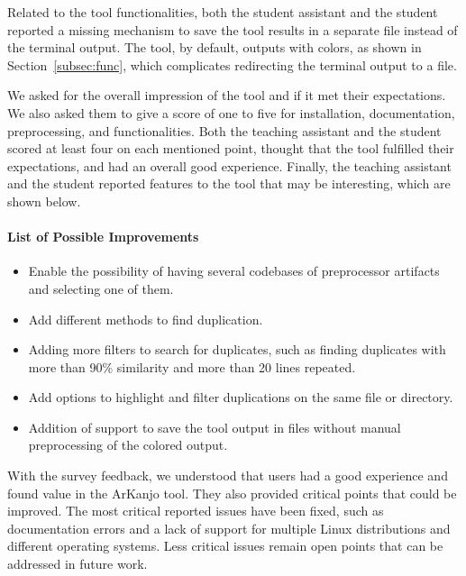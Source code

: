 Related to the tool functionalities, both the student assistant and the student reported 
a missing mechanism to save the tool results in a separate file instead of the terminal output. 
The tool, by default, outputs with colors, as shown in Section~\ref{subsec:func}, which complicates 
redirecting the terminal output to a file.

We asked for the overall impression of the tool and if it met their expectations. We also asked 
them to give a score of one to five for installation, documentation, preprocessing, and functionalities. 
Both the teaching assistant and the student scored at least four on each mentioned point, thought that 
the tool fulfilled their expectations, and had an overall good experience. Finally, the teaching assistant 
and the student reported features to the tool that may be interesting, which 
are shown below.

\paragraph{List of Possible Improvements}

\begin{itemize}

\item Enable the possibility of having several codebases of preprocessor artifacts and selecting one of them.

\item Add different methods to find duplication.

\item Adding more filters to search for duplicates, such as finding duplicates with more than 90\% 
similarity and more than 20 lines repeated.

\item Add options to highlight and filter duplications on the same file or directory.

\item Addition of support to save the tool output in files without manual preprocessing of the colored output.

\end{itemize}

With the survey feedback, we understood that users had a good experience and found value in the 
ArKanjo tool. They also provided critical points that could be improved. The most critical 
reported issues have been fixed, such as documentation errors and a lack of support for multiple Linux distributions 
and different operating systems. Less critical issues remain open points that 
can be addressed in future work.

